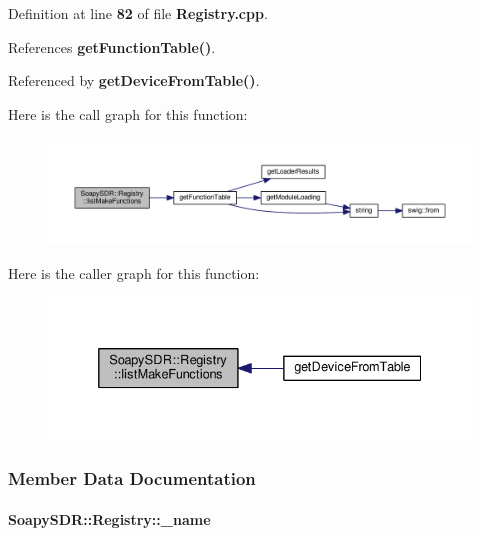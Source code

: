 Definition at line {\bf 82} of file {\bf Registry.\+cpp}.



References {\bf get\+Function\+Table()}.



Referenced by {\bf get\+Device\+From\+Table()}.



Here is the call graph for this function\+:
\nopagebreak
\begin{figure}[H]
\begin{center}
\leavevmode
\includegraphics[width=350pt]{d6/d07/classSoapySDR_1_1Registry_a7a85cd3dab62e1d4c2e400e1bc422183_cgraph}
\end{center}
\end{figure}




Here is the caller graph for this function\+:
\nopagebreak
\begin{figure}[H]
\begin{center}
\leavevmode
\includegraphics[width=332pt]{d6/d07/classSoapySDR_1_1Registry_a7a85cd3dab62e1d4c2e400e1bc422183_icgraph}
\end{center}
\end{figure}




\subsubsection{Member Data Documentation}
\paragraph[{\+\_\+name}]{ Soapy\+S\+D\+R\+::\+Registry\+::\+\_\+name\hspace{0.3cm}{\ttfamily [private]}}\label{classSoapySDR_1_1Registry_a7bb9a58b2560799ed0fe998e726e60b5}



